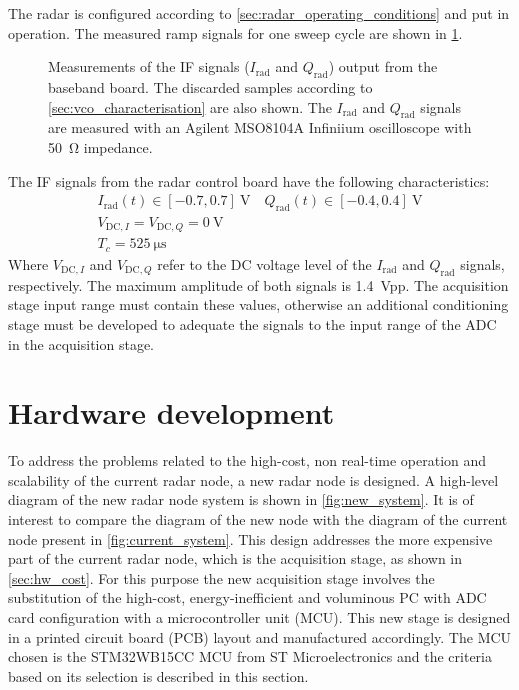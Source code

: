 The radar is configured according to \cref{sec:radar_operating_conditions} and put in operation. The measured ramp signals for one sweep cycle are shown in \cref{fig:if_raw}.

\begin{figure}[htb]
	\centering
	\caption{Measurements of the IF signals ($I_\mathrm{rad}$ and $Q_\mathrm{rad}$) output from the baseband board. The discarded samples according to \cref{sec:vco_characterisation} are also shown. The $I_\mathrm{rad}$ and $Q_\mathrm{rad}$ signals are measured with an Agilent MSO8104A Infiniium oscilloscope with \SI{50}{\ohm} impedance. \label{fig:if_raw}}
\end{figure}

The IF signals from the radar control board have the following characteristics:
\begin{gather} \label{eqn:iq_volts}
	I_\mathrm{rad}(t) \in [-0.7, 0.7]\ \si{\volt}\quad
	Q_\mathrm{rad}(t) \in [-0.4, 0.4]\ \si{\volt} \\
	V_{\mathrm{DC},I} = V_{\mathrm{DC},Q} = \SI{0}{\volt} \\
	T_c = \SI{525}{\micro\second}
\end{gather}
Where $V_{\mathrm{DC},I}$ and $V_{\mathrm{DC},Q}$ refer to the DC voltage level of the $I_\mathrm{rad}$ and $Q_\mathrm{rad}$ signals, respectively. The maximum amplitude of both signals is \SI{1.4}{Vpp}. The acquisition stage input range must contain these values, otherwise an additional conditioning stage must be developed to adequate the signals to the input range of the ADC in the acquisition stage.

\section{Hardware development} \label{sec:new_design}

To address the problems related to the high-cost, non real-time operation and scalability of the current radar node, a new radar node is designed. A high-level diagram of the new radar node system is shown in \cref{fig:new_system}. It is of interest to compare the diagram of the new node with the diagram of the current node present in \cref{fig:current_system}. This design addresses the more expensive part of the current radar node, which is the acquisition stage, as shown in \cref{sec:hw_cost}. For this purpose the new acquisition stage involves the substitution of the high-cost, energy-inefficient and voluminous PC with ADC card configuration with a microcontroller unit (MCU). This new stage is designed in a printed circuit board (PCB) layout and manufactured accordingly. The MCU chosen is the STM32WB15CC MCU from ST Microelectronics \cite{STMicroelectronics2022} and the criteria based on its selection is described in this section.

